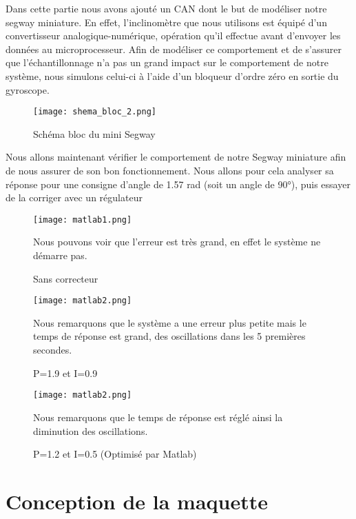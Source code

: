 \documentclass[oneside,a4paper,12pt]{article}
\begin{document}
	Dans cette partie nous avons ajouté un CAN dont le but de modéliser notre segway miniature.
	En effet, l’inclinomètre que nous utilisons est équipé d’un convertisseur analogique-numérique, opération qu’il effectue avant d’envoyer les données au microprocesseur.
	Afin de modéliser ce comportement et de s’assurer que l’échantillonnage n’a pas un grand impact sur le comportement de notre système, nous simulons celui-ci à l’aide d’un bloqueur d’ordre zéro en sortie du gyroscope.\\
	
	\begin{figure}[h]
		\centering
		\texttt{[image: shema\_bloc\_2.png]}
		\caption{Schéma bloc du mini Segway}
	\end{figure}
	
	Nous allons maintenant vérifier le comportement de notre Segway miniature afin de nous assurer de son bon fonctionnement. Nous allons pour cela analyser sa réponse pour une consigne d’angle de 1.57 rad (soit un angle de 90°), puis essayer de la corriger avec un régulateur
	
	\begin{figure}[h]
		\begingroup
		\centering
		\texttt{[image: matlab1.png]}
		\caption{Sans correcteur}
		\endgroup
		\vspace{0.5cm}
		Nous pouvons voir que l’erreur est très grand, en effet le système ne démarre pas.
	\end{figure}
	\begin{figure}[h]
		\begingroup
		\centering
		\texttt{[image: matlab2.png]}
		\caption{P=1.9 et I=0.9}
		\endgroup
		\vspace{0.5cm}
		Nous remarquons que le système a une erreur plus petite mais le temps de réponse est grand, des oscillations dans les 5 premières secondes.
	\end{figure}
	\begin{figure}[t]
		\begingroup
		\centering
		\texttt{[image: matlab2.png]}
		\caption{P=1.2 et I=0.5 (Optimisé par Matlab)}
		\endgroup
		\vspace{0.5cm}
		Nous remarquons que le temps de réponse est réglé ainsi la diminution des oscillations.
	\end{figure}

	\section{Conception de la maquette}
	
\end{document}
